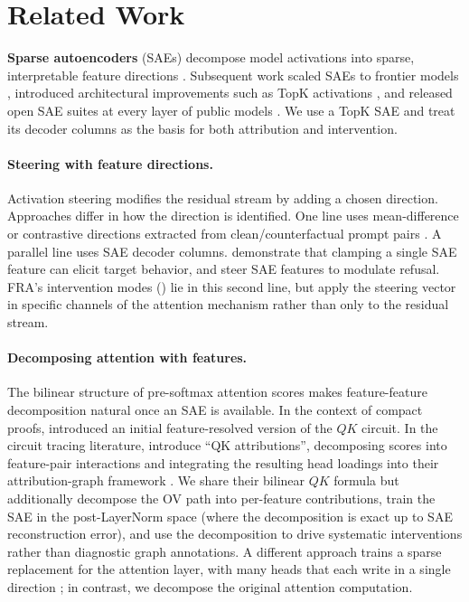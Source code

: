 \documentclass{article} %
\theoremstyle{plain}
\theoremstyle{definition}
\theoremstyle{remark}
\begin{document}
\section{Related Work}
\label{sec:related}

\textbf{Sparse autoencoders} (SAEs) decompose model activations into sparse, interpretable feature directions \citep{cunningham2023sparse,bricken2023monosemanticity}. Subsequent work scaled SAEs to frontier models \citep{templeton2024scaling}, introduced architectural improvements such as TopK activations \citep{gao2024scalingevaluatingsparseautoencoders}, and released open SAE suites at every layer of public models \citep{lieberum2024gemma}. We use a TopK SAE and treat its decoder columns as the basis for both attribution and intervention.

\paragraph{Steering with feature directions.} Activation steering modifies the residual stream by adding a chosen direction. Approaches differ in how the direction is identified. One line uses mean-difference or contrastive directions extracted from clean/counterfactual prompt pairs \citep{turner2023activation,panickssery2023steering}. A parallel line uses SAE decoder columns. \citet{templeton2024scaling} demonstrate that clamping a single SAE feature can elicit target behavior, and \citet{obrien2024steering} steer SAE features to modulate refusal. FRA's intervention modes () lie in this second line, but apply the steering vector in specific channels of the attention mechanism rather than only to the residual stream.

\paragraph{Decomposing attention with features.} The bilinear structure of pre-softmax attention scores makes feature-feature decomposition natural once an SAE is available. In the context of compact proofs, \citet{featints_compact_2025} introduced an initial feature-resolved version of the $QK$ circuit. In the circuit tracing literature, \citet{kamath2025tracing} introduce ``QK attributions'', decomposing scores into feature-pair interactions and integrating the resulting head loadings into their attribution-graph framework \citep{lindsey2025biology}. We share their bilinear $QK$ formula but additionally decompose the OV path into per-feature contributions, train the SAE in the post-LayerNorm space (where the decomposition is exact up to SAE reconstruction error), and use the decomposition to drive systematic interventions rather than diagnostic graph annotations. A different approach trains a sparse replacement for the attention layer, with many heads that each write in a single direction \citep{he2025lorsa}; in contrast, we decompose the original attention computation.
\end{document}
